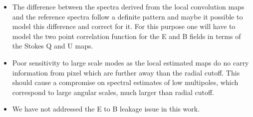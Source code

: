 \begin{itemize}
\item{The difference between the spectra derived from the local convolution maps and the reference spectra follow a definite pattern and maybe it possible to model this difference and correct for it. For this purpose one will have to model the two point correlation function for the E and B fields in terms of the Stokes Q and U maps.}

\item{Poor sensitivity to large scale modes as the local estimated maps do no carry information from pixel which are further away than the radial cutoff. This should cause a compromise on spectral estimates of low multipoles, which correspond to large angular scales, much larger than radial cutoff.}

\item{We have not addressed the E to B leakage issue in this work.}


\end{itemize}
%
